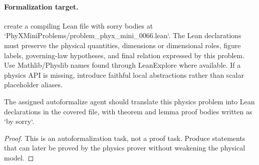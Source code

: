 \paragraph{Formalization target.}
create a compiling Lean file with sorry bodies at `PhyXMiniProblems/problem\_phyx\_mini\_0066.lean`. The Lean declarations must preserve the physical quantities, dimensions or dimensional roles, figure labels, governing-law hypotheses, and final relation expressed by this problem.
Use Mathlib/Physlib names found through LeanExplore where available. If a physics API is missing, introduce faithful local abstractions rather than scalar placeholder aliases.

\begin{theorem}
\label{thm:physics:phyx_mini_0066:target}
The assigned autoformalize agent should translate this physics problem into Lean declarations in the covered file, with theorem and lemma proof bodies written as `by sorry`.
\end{theorem}
\begin{proof}
This is an autoformalization task, not a proof task. Produce statements that can later be proved by the physics prover without weakening the physical model.
\end{proof}

